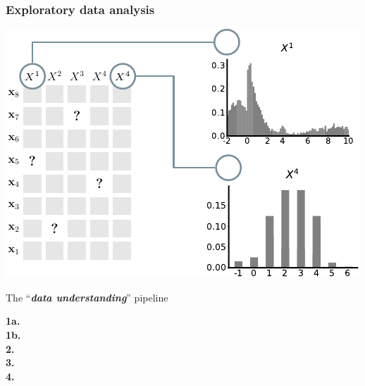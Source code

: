 \documentclass[xcolor={usenames,dvipsnames,svgnames}, compress, aspectratio=169, 11pt]{beamer}
\begin{document}
\begin{frame}[t, htt=bgrey2]
  \frametitle{Exploratory data analysis}
  \large
  \begin{minipage}[t]{0.6\linewidth}
    \vspace{5pt}
    \includegraphics[width=.9\linewidth]{figures/abda-miss-hist-type}
  \end{minipage}\hfill\begin{minipage}[t]{0.4\linewidth}
    \vspace{10pt}
    {The ``\emph{\textbf{data understanding}}'' pipeline}\\[3pt]
    \raggedleft\begin{minipage}[t]{.9\linewidth}
      {\textbf{1a.} \\[-2pt]}
      {\textbf{1b.}\hspace{0pt} \\[-2pt]}
      {\textbf{2.}\hspace{6pt} \\[-2pt]}
      {\textbf{3.}\hspace{6pt} \\[-2pt]}
      {\textbf{4.}\hspace{6pt} \\[-2pt]}
    \end{minipage}    
  \end{minipage}  
\end{frame}
\end{document}
